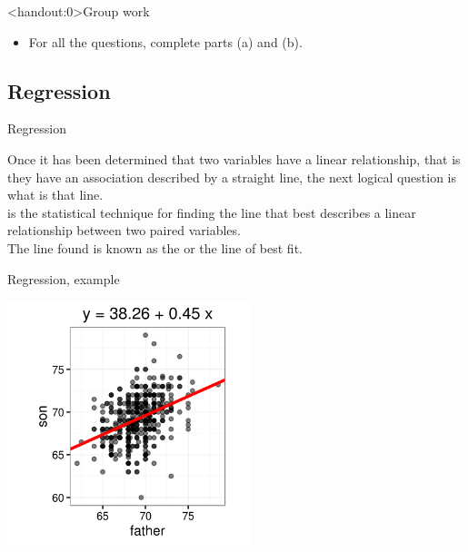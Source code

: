 \documentclass[xcolor=table, aspectratio=169, bigger]{beamer}
\begin{document}
\begin{frame}<handout:0>{Group work}
\begin{block}{}
\begin{itemize}
\item For all the questions, complete parts (a) and (b).
\end{itemize}
\end{block}
\end{frame}

%
%
\subsection{Regression}

\begin{frame}{Regression}
\begin{block}{}
Once it has been determined that two variables have a linear relationship, that is they have an association described by a straight line, the next logical question is what is that line.\\
\pause\medskip
{} is the statistical technique for finding the line that best describes a linear relationship between two paired variables.\\
\pause\medskip
The line found is known as the  or the line of best fit.
\end{block}
\end{frame}

\begin{frame}{Regression, example}

\medskip
{\centering
\includegraphics[width=2.8in]{../images/ch10_reg_galton}
\par}

\end{frame}
\end{document}
